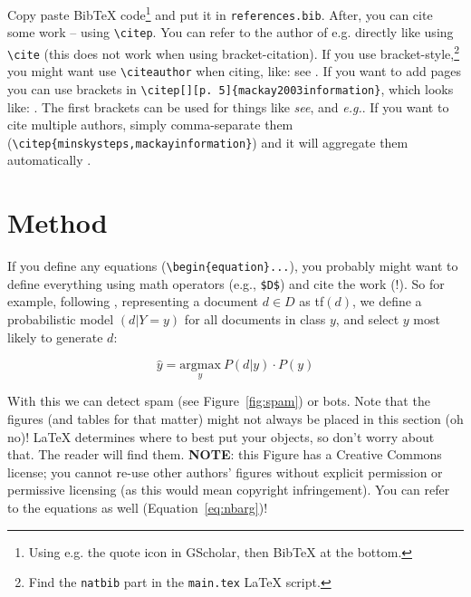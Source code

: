 \documentclass[11pt, a4paper]{article}
\begin{document}
Copy paste BibTeX code\footnote{Using e.g. the quote icon in GScholar, then BibTeX at the bottom.} and put it in \texttt{references.bib}. After, you can cite some work \citep{mackay2003information} -- using \texttt{\textbackslash citep}. You can refer to the author of e.g. \cite{minsky1961steps} directly like using \texttt{\textbackslash cite} (this does not work when using bracket-citation). If you use bracket-style,\footnote{Find the \texttt{natbib} part in the \texttt{main.tex} \LaTeX{} script.} you might want use \texttt{\textbackslash citeauthor} when citing, like: see \citeauthor{ananny2018seeing} \cite{ananny2018seeing}.  If you want to add pages you can use brackets in \texttt{\textbackslash citep[][p. 5]\{mackay2003information\}}, which looks like: \citep[][p. 5]{mackay2003information}. The first brackets can be used for things like \emph{see}, and \emph{e.g.}. If you want to cite multiple authors, simply comma-separate them (\texttt{\textbackslash citep\{\-minsky\-steps,\-mackay\-information\}}) and it will aggregate them automatically \citep{minsky1961steps,mackay2003information}.

\section{Method}

If you define any equations (\verb|\begin{equation}...|), you probably might want to define everything using math operators (e.g., \verb|$D$|) and cite the work (!). So for example, following \cite{lewis1994sequential}, representing a document $d \in D$ as tf$(d)$, we define a probabilistic model $(d | Y = y)$ for all documents in class $y$, and select $y$ most likely to generate $d$:

\begin{equation} \label{eq:nbarg}
    \hat{y} = \underset{y}{\mathrm{argmax}} \ P(d | y) \cdot P(y)
\end{equation}

With this we can detect spam (see Figure~\ref{fig:spam}) or bots.  Note that the figures (and tables for that matter) might not always be placed in this section (oh no)! \LaTeX{} determines where to best put your objects, so don't worry about that. The reader will find them. \textbf{NOTE}: this Figure has a Creative Commons license; you cannot re-use other authors' figures without explicit permission or permissive licensing (as this would mean copyright infringement). You can refer to the equations as well (Equation~\ref{eq:nbarg})!
\end{document}
